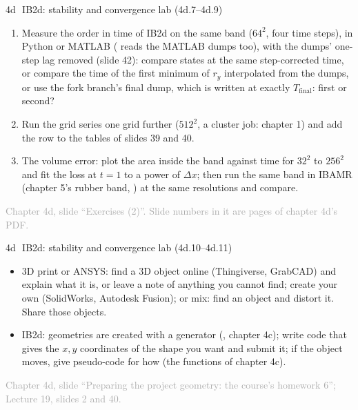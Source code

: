 \documentclass[aspectratio=169,11pt]{beamer}
\newcommand{\sourcecredit}[1]{\vfill\begin{flushright}\tiny\textcolor{DarkGray}{#1}\end{flushright}}
\begin{document}
\begin{frame}{4d\,\textbullet\ IB2d: stability and convergence lab (4d.7--4d.9)}
\label{fr:c4dx7}
\small
\begin{enumerate}
  
  \item[4d.7] Measure the order in time of IB2d on the same band ($64^2$, four time steps), in Python or MATLAB ( reads the MATLAB dumps too), with the dumps' one-step lag removed (slide 42): compare states at the same step-corrected time, or compare the time of the first minimum of $r_y$ interpolated from the dumps, or use the fork branch's final dump, which is written at exactly $T_{\text{final}}$: first or second?
  \item[4d.8] Run the grid series one grid further ($512^2$, a cluster job: chapter 1) and add the row to the tables of slides 39 and 40.
  \item[4d.9] The volume error: plot the area inside the band against time for $32^2$ to $256^2$ and fit the loss at $t = 1$ to a power of $\Delta x$; then run the same band in IBAMR (chapter 5's rubber band, ) at the same resolutions and compare.
\end{enumerate}
\sourcecredit{Chapter 4d, slide ``Exercises (2)''. Slide numbers in it are pages of chapter 4d's PDF.}
\end{frame}

\begin{frame}{4d\,\textbullet\ IB2d: stability and convergence lab (4d.10--4d.11)}
\label{fr:c4dx10}
\small
{}
\begin{itemize}
  \item[4d.10] 3D print or ANSYS: find a 3D object online (Thingiverse, GrabCAD) and explain what it is, or leave a note of anything you cannot find; create your own (SolidWorks, Autodesk Fusion); or mix: find an object and distort it. Share those objects.
  \item[4d.11] IB2d: geometries are created with a generator (, chapter 4c); write code that gives the $x, y$ coordinates of the shape you want and submit it; if the object moves, give pseudo-code for how (the  functions of chapter 4c).
\end{itemize}
\sourcecredit{Chapter 4d, slide ``Preparing the project geometry: the course's homework 6''; Lecture 19, slides 2 and 40.}
\end{frame}
\end{document}

